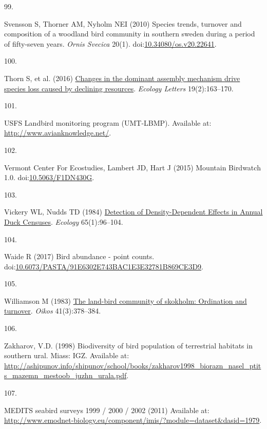 \documentclass{article}
\newlength{\cslhangindent}
\newlength{\csllabelwidth}
\newlength{\cslentryspacingunit} %
\newenvironment{CSLReferences}[2] %
 {%
  \setlength{\parindent}{0pt}
  \ifodd #1
  \let\oldpar\par
  \def\par{\hangindent=\cslhangindent\oldpar}
  \fi
  \setlength{\parskip}{#2\cslentryspacingunit}
 }%
 {}
\newcommand{\CSLLeftMargin}[1]{\parbox[t]{\csllabelwidth}{#1}}
\newcommand{\CSLRightInline}[1]{\parbox[t]{\linewidth - \csllabelwidth}{#1}\break}
\begin{document}
\begin{CSLReferences}{0}{0}
\leavevmode{}%
\CSLLeftMargin{99. }%
\CSLRightInline{Svensson S, Thorner AM, Nyholm NEI (2010) Species
trends, turnover and composition of a woodland bird community in
southern sweden during a period of fifty-seven years. \emph{Ornis
Svecica} 20(1).
doi:\href{https://doi.org/10.34080/os.v20.22641}{10.34080/os.v20.22641}.}

\leavevmode{}%
\CSLLeftMargin{100. }%
\CSLRightInline{Thorn S, et al. (2016)
\href{https://doi.org/10.1111/ele.12548}{Changes in the dominant
assembly mechanism drive species loss caused by declining resources}.
\emph{Ecology Letters} 19(2):163--170.}

\leavevmode{}%
\CSLLeftMargin{101. }%
\CSLRightInline{USFS Landbird monitoring program (UMT-LBMP). Available
at: \url{http://www.avianknowledge.net/}.}

\leavevmode{}%
\CSLLeftMargin{102. }%
\CSLRightInline{Vermont Center For Ecostudies, Lambert JD, Hart J (2015)
Mountain Birdwatch 1.0.
doi:\href{https://doi.org/10.5063/F1DN430G}{10.5063/F1DN430G}.}

\leavevmode{}%
\CSLLeftMargin{103. }%
\CSLRightInline{Vickery WL, Nudds TD (1984)
\href{https://doi.org/10.2307/1939462}{Detection of Density-Dependent
Effects in Annual Duck Censuses}. \emph{Ecology} 65(1):96--104.}

\leavevmode{}%
\CSLLeftMargin{104. }%
\CSLRightInline{Waide R (2017) Bird abundance - point counts.
doi:\href{https://doi.org/10.6073/PASTA/91E6302E743BAC1E3E32781B869CE3D9}{10.6073/PASTA/91E6302E743BAC1E3E32781B869CE3D9}.}

\leavevmode{}%
\CSLLeftMargin{105. }%
\CSLRightInline{Williamson M (1983)
\href{https://doi.org/10.2307/3544096}{The land-bird community of
skokholm: Ordination and turnover}. \emph{Oikos} 41(3):378--384.}

\leavevmode{}%
\CSLLeftMargin{106. }%
\CSLRightInline{Zakharov, V.D. (1998) Biodiversity of bird population of
terrestrial habitats in southern ural. Miass: IGZ. Available at:
\url{http://ashipunov.info/shipunov/school/books/zakharov1998_biorazn_nasel_ptits_mazemn_mestoob_juzhn_urala.pdf}.}

\leavevmode{}%
\CSLLeftMargin{107. }%
\CSLRightInline{MEDITS seabird surveys 1999 / 2000 / 2002 (2011)
Available at:
\url{http://www.emodnet-biology.eu/component/imis/?module=dataset\&dasid=1979}.}


\end{CSLReferences}
\end{document}
